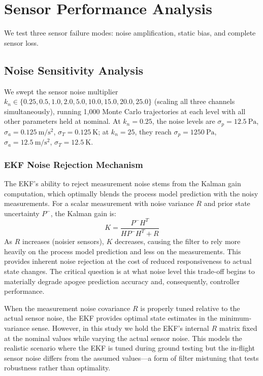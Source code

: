 \documentclass[11pt,letterpaper]{article}
\begin{document}
\section{Sensor Performance Analysis}
\label{sec:sensor}

We test three sensor failure modes: noise amplification, static bias, and complete sensor loss.

\subsection{Noise Sensitivity Analysis}
\label{sec:noise_sensitivity}

We swept the sensor noise multiplier $k_n \in \{0.25, 0.5, 1.0, 2.0, 5.0, 10.0, 15.0, 20.0, 25.0\}$ (scaling all three channels simultaneously), running 1{,}000 Monte Carlo trajectories at each level with all other parameters held at nominal. At $k_n = 0.25$, the noise levels are $\sigma_p = \SI{12.5}{\pascal}$, $\sigma_a = \SI{0.125}{\metre\per\second\squared}$, $\sigma_T = \SI{0.125}{\kelvin}$; at $k_n = 25$, they reach $\sigma_p = \SI{1250}{\pascal}$, $\sigma_a = \SI{12.5}{\metre\per\second\squared}$, $\sigma_T = \SI{12.5}{\kelvin}$.

\subsubsection{EKF Noise Rejection Mechanism}

The EKF's ability to reject measurement noise stems from the Kalman gain computation, which optimally blends the process model prediction with the noisy measurements. For a scalar measurement with noise variance $R$ and prior state uncertainty $P^{-}$, the Kalman gain is:
\begin{equation}
    K = \frac{P^{-} H^T}{H P^{-} H^T + R}
    \label{eq:kalman_gain_noise}
\end{equation}
As $R$ increases (noisier sensors), $K$ decreases, causing the filter to rely more heavily on the process model prediction and less on the measurements. This provides inherent noise rejection at the cost of reduced responsiveness to actual state changes. The critical question is at what noise level this trade-off begins to materially degrade apogee prediction accuracy and, consequently, controller performance.

When the measurement noise covariance $R$ is properly tuned relative to the actual sensor noise, the EKF provides optimal state estimates in the minimum-variance sense. However, in this study we hold the EKF's internal $R$ matrix fixed at the nominal values while varying the actual sensor noise. This models the realistic scenario where the EKF is tuned during ground testing but the in-flight sensor noise differs from the assumed values---a form of filter mistuning that tests robustness rather than optimality.
\end{document}
